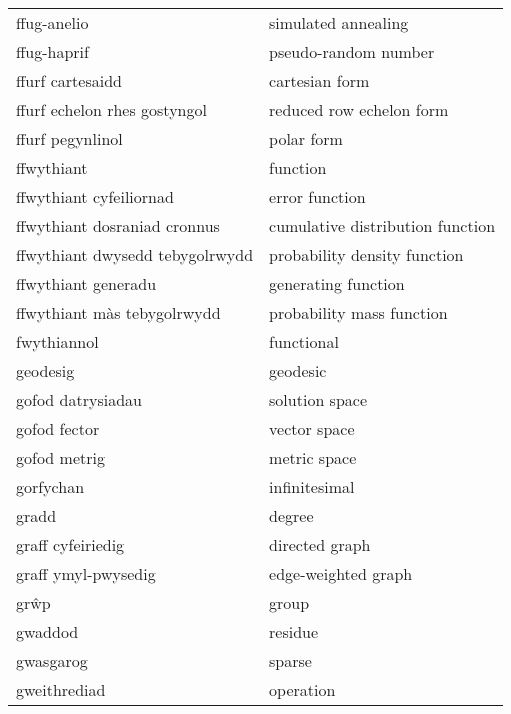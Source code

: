 \begin{supertabular}{p{0.22\textwidth}p{0.22\textwidth}}
                    ffug-anelio &              simulated annealing \\
                    ffug-haprif &             pseudo-random number \\
               ffurf cartesaidd &                   cartesian form \\
   ffurf echelon rhes gostyngol &         reduced row echelon form \\
               ffurf pegynlinol &                       polar form \\
                     ffwythiant &                         function \\
        ffwythiant cyfeiliornad &                   error function \\
   ffwythiant dosraniad cronnus & cumulative distribution function \\
ffwythiant dwysedd tebygolrwydd &     probability density function \\
            ffwythiant generadu &              generating function \\
    ffwythiant màs tebygolrwydd &        probability mass function \\
                    fwythiannol &                       functional \\
                       geodesig &                         geodesic \\
              gofod datrysiadau &                   solution space \\
                   gofod fector &                     vector space \\
                   gofod metrig &                     metric space \\
                      gorfychan &                    infinitesimal \\
                          gradd &                           degree \\
              graff cyfeiriedig &                   directed graph \\
            graff ymyl-pwysedig &              edge-weighted graph \\
                           grŵp &                            group \\
                        gwaddod &                          residue \\
                      gwasgarog &                           sparse \\
                   gweithrediad &                        operation \\

\end{supertabular}
